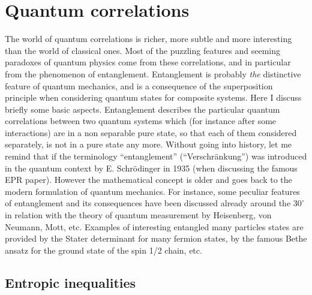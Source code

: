 \section{Quantum correlations}
\label{sQuCor}
The world of quantum correlations is richer, more subtle and more interesting than the world of classical ones. Most of the puzzling features and seeming paradoxes of quantum physics come from these correlations, and in particular from the phenomenon of entanglement. 
Entanglement is probably \emph{the} distinctive feature of quantum mechanics, and is a consequence of the superposition principle when considering quantum states for composite systems. Here I discuss briefly some basic aspects.
Entanglement describes the particular quantum correlations between two quantum systems which (for instance after some interactions) are in a non separable pure state,  so that each of them considered separately, is not in a pure state any more.
Without going into history, let me remind that if the terminology ``entanglement'' (``Verschr\"{a}nkung'') was introduced in the quantum context  by E. Schr\"{o}dinger in 1935 (when discussing the famous EPR paper).
However the mathematical concept 
 is older and goes back to the modern formulation of quantum mechanics. 
 For instance, some peculiar features of entanglement and its consequences have been  discussed already around the 30' in relation with the theory of quantum measurement by Heisenberg, von Neumann, Mott, etc. Examples of interesting entangled many particles states are provided by the Stater determinant for many fermion states, by the famous Bethe ansatz for the ground state of the spin 1/2 chain, etc.
 
\subsection{Entropic inequalities}
